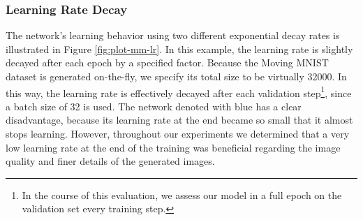 \subsubsection*{Learning Rate Decay}

The network's learning behavior using two different exponential decay rates is illustrated in Figure \ref{fig:plot-mm-lr}. In this example, the learning rate is slightly decayed after each epoch by a specified factor. Because the Moving MNIST dataset is generated on-the-fly, we specify its total size to be virtually \num{32000}. In this way, the learning rate is effectively decayed after each validation step\footnote{In the course of this evaluation, we assess our model in a full epoch on the validation set every  training step.}, since a batch size of \num{32} is used. The network denoted with blue has a clear disadvantage, because its learning rate at the end became so small that it almost stops learning. However, throughout our experiments we determined that a very low learning rate at the end of the training was beneficial regarding the image quality and finer details of the generated images.

